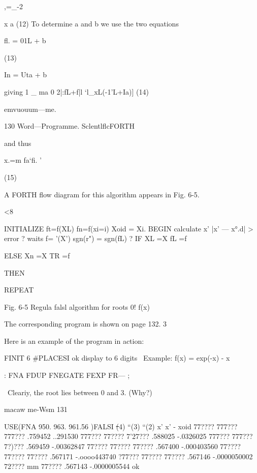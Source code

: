 {,=_-2

x a (12)
To determine a and b we use the two equations

fl. = 01L + b

(13)

In = Uta + b

giving
1 _ ma
0 2|:fL+f|l ‘l_xL(-1'L+Ia)] (14)

emvuouum—me.

130 Word—Programme. SclentlﬂcFORTH

and thus

x.=m
fa‘fi. '

(15)

A FORTH ﬂow diagram for this algorithm appears in Fig. 6-5.

 

<8

 

 

 

 

 

 

 

 

 

 

 

 

 

 

INITIALIZE
ft=f(XL) fn=f(xi=i)
Xoid = Xi.
BEGIN calculate x’
|x' — x°.d| > error
?
waits
f= '(X’)
sgn(r") = sgn(fL) ?
IF XL =X fL =f

ELSE Xn =X TR =f

THEN

 

REPEAT

Fig. 6-5 Regula falsl algorithm for roots 0! f(x)

The corresponding program is shown on page 132. 3

Here is an example of the program in action:

FINIT 6 #PLACESI ok \set display to 6 digits
\ Example: f(x) = exp(-x) - x

: FNA FDUP FNEGATE FEXP FR— ;

\ Cleariy, the root lies between 0 and 3. (Why?)

macaw me-Wsm 131

USE(FNA 950. 963. 961.56 )FALSI
\st(4) “(3) “(2) x' x' - xoid
77???? 777??? 777??? .759452 ..291530
777??? 77???? 7'27??? .588025 -.0326025
777??? 777??? 7?)??? .569459 -.00362847
77???? 77???? 77???? .567400 -.000403560
77???? 77???? 77???? .567171 -.oooo443740
?77??? 77???? 77???? .567146 -.0000050002
72???? mm 77???? .567143 -.0000005544 ok

}
